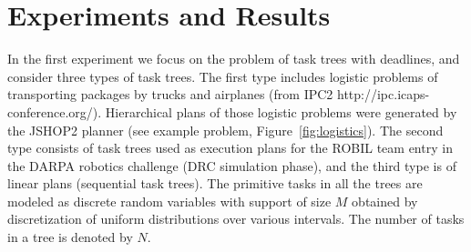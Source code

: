 \documentclass{article}
\begin{document}
\section{Experiments and Results}
In the first experiment we focus on the problem of task trees with deadlines, and consider three types of task trees.
The first type includes logistic problems of transporting packages by trucks and airplanes (from IPC2 http://ipc.icaps-conference.org/). Hierarchical plans of those logistic problems were generated by the JSHOP2 planner \cite{nau2003shop2} (see example problem, Figure~\ref{fig:logistics}). 
The second type consists of task trees used as execution plans for the ROBIL team entry in the DARPA robotics challenge (DRC simulation phase), and the third type is of linear plans (sequential task trees).
The primitive tasks in all the trees are modeled as discrete random variables with support of size $M$ obtained by discretization of uniform distributions over various intervals. The number of tasks in a tree is denoted by $N$. 
\end{document}
